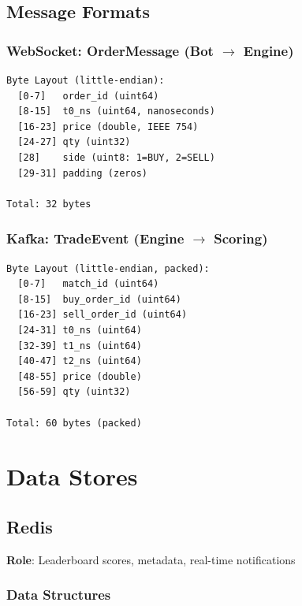 \documentclass[10pt,a4paper,oneside]{report}
\begin{document}
\section{Message Formats}

\subsection{WebSocket: OrderMessage (Bot $\rightarrow$ Engine)}

\begin{lstlisting}
Byte Layout (little-endian):
  [0-7]   order_id (uint64)
  [8-15]  t0_ns (uint64, nanoseconds)
  [16-23] price (double, IEEE 754)
  [24-27] qty (uint32)
  [28]    side (uint8: 1=BUY, 2=SELL)
  [29-31] padding (zeros)

Total: 32 bytes
\end{lstlisting}

\subsection{Kafka: TradeEvent (Engine $\rightarrow$ Scoring)}

\begin{lstlisting}
Byte Layout (little-endian, packed):
  [0-7]   match_id (uint64)
  [8-15]  buy_order_id (uint64)
  [16-23] sell_order_id (uint64)
  [24-31] t0_ns (uint64)
  [32-39] t1_ns (uint64)
  [40-47] t2_ns (uint64)
  [48-55] price (double)
  [56-59] qty (uint32)

Total: 60 bytes (packed)
\end{lstlisting}

\chapter{Data Stores}

\section{Redis}

\textbf{Role}: Leaderboard scores, metadata, real-time notifications

\subsection{Data Structures}
\end{document}
